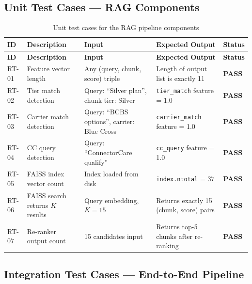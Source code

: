 \documentclass[12pt, letterpaper]{article}
\begin{document}
\subsection{Unit Test Cases --- RAG Components}

\begin{longtable}{p{1cm} p{3.8cm} p{3.2cm} p{3.2cm} p{1.5cm}}
  \caption{Unit test cases for the RAG pipeline components}
  \label{tab:unit_tests_model} \\
  \toprule
  \textbf{ID} & \textbf{Description} & \textbf{Input} & \textbf{Expected Output} & \textbf{Status} \\
  \midrule
  \endfirsthead
  \toprule
  \textbf{ID} & \textbf{Description} & \textbf{Input} & \textbf{Expected Output} & \textbf{Status} \\
  \midrule
  \endhead
  \bottomrule
  \endlastfoot
  RT-01 & Feature vector length & Any (query, chunk, score) triple & Length of output list is exactly 11 & \textcolor{commentgreen}{\textbf{PASS}} \\[4pt]
  RT-02 & Tier match detection & Query: ``Silver plan'', chunk tier: Silver & \texttt{tier\_match} feature = 1.0 & \textcolor{commentgreen}{\textbf{PASS}} \\[4pt]
  RT-03 & Carrier match detection & Query: ``BCBS options'', carrier: Blue Cross & \texttt{carrier\_match} feature = 1.0 & \textcolor{commentgreen}{\textbf{PASS}} \\[4pt]
  RT-04 & CC query detection & Query: ``ConnectorCare qualify'' & \texttt{cc\_query} feature = 1.0 & \textcolor{commentgreen}{\textbf{PASS}} \\[4pt]
  RT-05 & FAISS index vector count & Index loaded from disk & \texttt{index.ntotal} = 37 & \textcolor{commentgreen}{\textbf{PASS}} \\[4pt]
  RT-06 & FAISS search returns $K$ results & Query embedding, $K=15$ & Returns exactly 15 (chunk, score) pairs & \textcolor{commentgreen}{\textbf{PASS}} \\[4pt]
  RT-07 & Re-ranker output count & 15 candidates input & Returns top-5 chunks after re-ranking & \textcolor{commentgreen}{\textbf{PASS}} \\
\end{longtable}

\subsection{Integration Test Cases --- End-to-End Pipeline}
\end{document}
